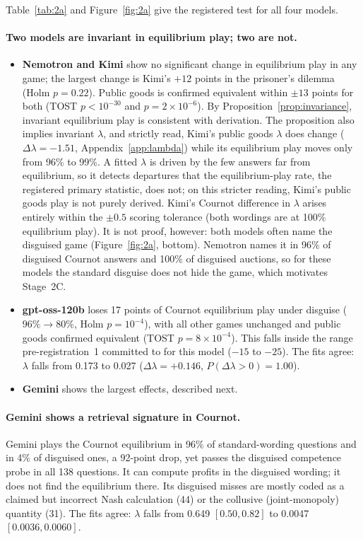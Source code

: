 \documentclass[10pt]{article}
\theoremstyle{definition}
\theoremstyle{remark}
\newcommand{\lam}{\lambda}
\begin{document}
Table~\ref{tab:2a} and Figure~\ref{fig:2a} give the registered test for all four models.

\paragraph{Two models are invariant in equilibrium play; two are not.}
\begin{itemize}
\item \textbf{Nemotron and Kimi} show no significant change in equilibrium play in any game; the
  largest change is Kimi's $+12$ points in the prisoner's dilemma (Holm $p=0.22$). Public goods
  is confirmed equivalent within $\pm13$ points for both (TOST $p<10^{-30}$ and
  $p=2\times10^{-6}$). By Proposition~\ref{prop:invariance}, invariant equilibrium play is
  consistent with derivation. The proposition also implies invariant $\lam$, and strictly read,
  Kimi's public goods $\lam$ does change ($\Delta\lam=-1.51$, Appendix~\ref{app:lambda}) while
  its equilibrium play moves only from 96\% to 99\%. A fitted $\lam$ is driven by the few
  answers far from equilibrium, so it detects departures that the equilibrium-play rate, the
  registered primary statistic, does not; on this stricter reading, Kimi's public goods play is
  not purely derived. Kimi's Cournot difference in $\lam$ arises entirely within the $\pm0.5$
  scoring tolerance (both wordings are at 100\% equilibrium play). It is not proof,
  however: both models often name the disguised game (Figure~\ref{fig:2a}, bottom). Nemotron
  names it in 96\% of disguised Cournot answers and 100\% of disguised auctions, so for these
  models the standard disguise does not hide the game, which motivates Stage~2C.
\item \textbf{gpt-oss-120b} loses 17 points of Cournot equilibrium play under disguise
  ($96\%\to80\%$, Holm $p=10^{-4}$), with all other games unchanged and public goods confirmed
  equivalent (TOST $p=8\times10^{-4}$). This falls inside the range pre-registration~1 committed
  to for this model ($-15$ to $-25$). The fits agree: $\lam$ falls from 0.173 to 0.027
  ($\Delta\lam=+0.146$, $P(\Delta\lam>0)=1.00$).
\item \textbf{Gemini} shows the largest effects, described next.
\end{itemize}

\paragraph{Gemini shows a retrieval signature in Cournot.} Gemini plays the Cournot equilibrium
in 96\% of standard-wording questions and in 4\% of disguised ones, a 92-point drop, yet passes the
disguised competence probe in all 138 questions. It can compute profits in the disguised
wording; it does not find the equilibrium there. Its disguised misses are mostly coded as a
claimed but incorrect Nash calculation (44) or the collusive (joint-monopoly) quantity (31). The
fits agree: $\lam$ falls from 0.649 $[0.50,0.82]$ to 0.0047 $[0.0036,0.0060]$.
\end{document}
